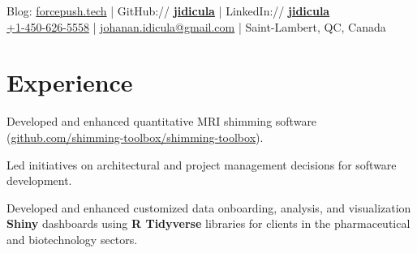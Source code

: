\documentclass[]{jidicula-resume}
\begin{document}
\lastupdated


{ Blog: \href{http://bit.ly/jidicula-site}{forcepush.tech}
  | GitHub:// \href{http://bit.ly/jidicula_github}{\bf jidicula} | LinkedIn:// \href{https://bit.ly/jidicula-linkedin}{\bf jidicula} \\
  \href{tel:14506265558}{+1-450-626-5558}
  | \href{mailto:johanan.idicula+resume@gmail.com}{johanan.idicula@gmail.com}
  | Saint-Lambert, QC, Canada}

\section{Experience}

\vspace{\topsep} %
\begin{tightemize}
\item Developed and enhanced quantitative MRI shimming software (\href{http://bit.ly/jidicula-shimming-toolbox}{github.com/shimming-toolbox/shimming-toolbox}).
\item Led initiatives on architectural and project management decisions for software development.
\end{tightemize}
\sectionsep

\vspace{\topsep} %
\begin{tightemize}
\item Developed and enhanced customized data onboarding, analysis, and
  visualization \textbf{Shiny} dashboards using \textbf{R Tidyverse} libraries
  for clients in the pharmaceutical and biotechnology sectors.
\end{tightemize}
\sectionsep
\end{document}
